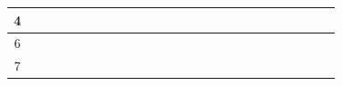 \begin{quadro}[htb]
\begin{tabular}{|c|cccc|cccc|cccc|cccc|cccc|cccc|}
4 	& \multicolumn{1}{c|}{} & \multicolumn{1}{c|}{} & \multicolumn{1}{c|}{}  &   & \multicolumn{1}{c|}{}  & \multicolumn{1}{c|}{}  & \multicolumn{1}{c|}{}  &   & \multicolumn{1}{c|}{}  & \multicolumn{1}{c|}{}  & \multicolumn{1}{c|}{}  &   & \multicolumn{1}{c|}{}  & \multicolumn{1}{c|}{}  & \multicolumn{1}{c|}{}  &   & \multicolumn{1}{c|}{}  & \multicolumn{1}{c|}{}  & \multicolumn{1}{c|}{}  &   & \multicolumn{1}{c|}{}  & \multicolumn{1}{c|}{}  & \multicolumn{1}{c|}{}  &   \\ \hline

6 	& \multicolumn{1}{c|}{} & \multicolumn{1}{c|}{} & \multicolumn{1}{c|}{}  &   & \multicolumn{1}{c|}{}  & \multicolumn{1}{c|}{}  & \multicolumn{1}{c|}{}  &   & \multicolumn{1}{c|}{}  & \multicolumn{1}{c|}{}  & \multicolumn{1}{c|}{}  &   & \multicolumn{1}{c|}{}  & \multicolumn{1}{c|}{}  & \multicolumn{1}{c|}{}  &   & \multicolumn{1}{c|}{}  & \multicolumn{1}{c|}{}  & \multicolumn{1}{c|}{}  &   & \multicolumn{1}{c|}{}  & \multicolumn{1}{c|}{}  & \multicolumn{1}{c|}{}  &   \\ \hline

7 	& \multicolumn{1}{c|}{} & \multicolumn{1}{c|}{} & \multicolumn{1}{c|}{}  &   & \multicolumn{1}{c|}{}  & \multicolumn{1}{c|}{}  & \multicolumn{1}{c|}{}  &   & \multicolumn{1}{c|}{}  & \multicolumn{1}{c|}{}  & \multicolumn{1}{c|}{}  &   & \multicolumn{1}{c|}{}  & \multicolumn{1}{c|}{}  & \multicolumn{1}{c|}{}  &   & \multicolumn{1}{c|}{}  & \multicolumn{1}{c|}{}  & \multicolumn{1}{c|}{}  &   & \multicolumn{1}{c|}{}  & \multicolumn{1}{c|}{}  & \multicolumn{1}{c|}{}  &   \\ \hline

\end{tabular}
\end{quadro}
